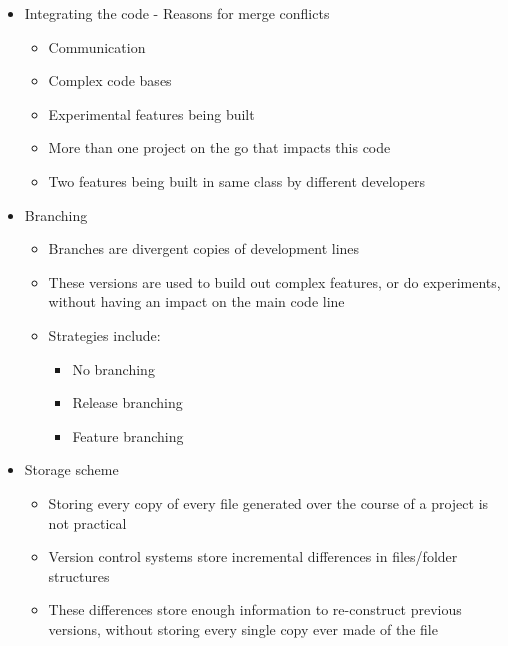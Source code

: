 \begin{itemize}
		\item Integrating the code - Reasons for merge conflicts\\[-15pt]

		\begin{minipage}[t]{0.3\textwidth}
			\begin{itemize}
				\item Communication
				\item Complex code bases
				\item Experimental features being built
			\end{itemize}
		\end{minipage}
		\begin{minipage}[t]{0.5\textwidth}
			\begin{itemize}
				\item More than one project on the go that impacts this code
				\item Two features being built in same class by different developers
			\end{itemize}
		\end{minipage}

		\item Branching
		\begin{itemize}
			\item Branches are divergent copies of development lines
			\item These versions are used to build out complex features, or do experiments,
			without having an impact on the main code line
			\item Strategies include:
			\begin{itemize}
				\item No branching
				\item Release branching
				\item Feature branching
			\end{itemize}
		\end{itemize}

		\item Storage scheme
		\begin{itemize}
			\item Storing every copy of every file generated over the course of a project is not practical
			\item Version control systems store incremental differences in files/folder structures
			\item These differences store enough information to re-construct previous versions, without storing every single copy ever made of the file
		\end{itemize}


\end{itemize}
